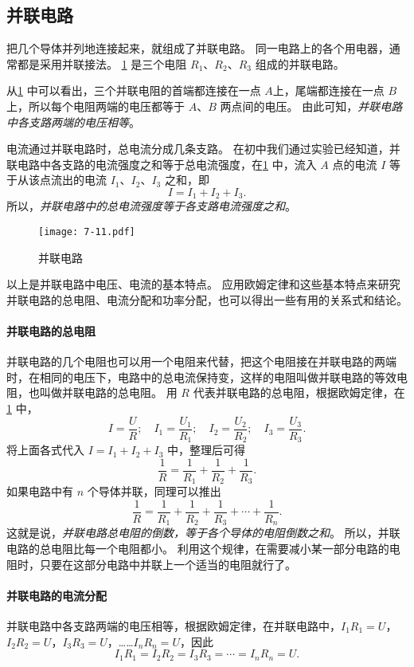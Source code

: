 \subsection{并联电路}
把几个导体并列地连接起来，就组成了并联电路。
同一电路上的各个用电器，通常都是采用并联接法。
\cref{fig:7-11} 是三个电阻 $R_1$、$R_2$、$R_3$ 组成的并联电路。

从\cref{fig:7-11} 中可以看出，三个并联电阻的首端都连接在一点 $A$上，尾端都连接在一点 $B$ 上，所以每个电阻两端的电压都等于 $A$、$B$ 两点间的电压。
由此可知，\emph{并联电路中各支路两端的电压相等}。

电流通过并联电路时，总电流分成几条支路。
在初中我们通过实验已经知道，并联电路中各支路的电流强度之和等于总电流强度，在\cref{fig:7-11} 中，流入 $A$ 点的电流 $I$ 等于从该点流出的电流 $I_1$、$I_2$、$I_3$ 之和，即
\[I=I_1+I_2+I_3.\]
所以，\emph{并联电路中的总电流强度等于各支路电流强度之和}。
\begin{figure}
  \texttt{[image: 7-11.pdf]}
  \caption{并联电路}\label{fig:7-11}
\end{figure}	

以上是并联电路中电压、电流的基本特点。
应用欧姆定律和这些基本特点来研究并联电路的总电阻、电流分配和功率分配，也可以得出一些有用的关系式和结论。

\paragraph{并联电路的总电阻} 并联电路的几个电阻也可以用一个电阻来代替，把这个电阻接在并联电路的两端时，在相同的电压下，电路中的总电流保持变，这样的电阻叫做并联电路的等效电阻，也叫做并联电路的总电阻。
用 $R$ 代表并联电路的总电阻，根据欧姆定律，在\cref{fig:7-11} 中，
\[I=\frac{U}{R};\quad I_1=\frac{U_1}{R_1};\quad I_2=\frac{U_2}{R_2};\quad I_3=\frac{U_3}{R_3}.\]
将上面各式代入 $I=I_1+I_2+I_3$ 中，整理后可得
\[\frac{1}{R}=\frac{1}{R_1}+\frac{1}{R_2}+\frac{1}{R_3}.\]
如果电路中有 $n$ 个导体并联，同理可以推出
\[\frac{1}{R}=\frac{1}{R_1}+\frac{1}{R_2}+\frac{1}{R_3}+\cdots+\frac{1}{R_n}.\]
这就是说，\emph{并联电路总电阻的倒数，等于各个导体的电阻倒数之和}。
所以，并联电路的总电阻比每一个电阻都小。
利用这个规律，在需要减小某一部分电路的电阻时，只要在这部分电路中并联上一个适当的电阻就行了。

\paragraph{并联电路的电流分配} 并联电路中各支路两端的电压相等，根据欧姆定律，在并联电路中，$I_1R_1=U$，$I_2R_2=U$，$I_3R_3=U$，……$I_nR_n=U$，因此
\[I_1R_1=I_2R_2=I_3R_3=\cdots=I_nR_n=U.\]

